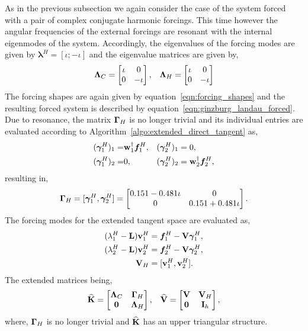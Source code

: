As in the previous subsection we again consider the case of the system forced with a pair of complex conjugate harmonic forcings. This time however the angular frequencies of the external forcings are resonant with the internal eigenmodes of the system. Accordingly, the eigenvalues of the forcing modes are given by $\boldsymbol{\lambda}^{H} = [\iota; -\iota]$ and the eigenvalue matrices are given by,
\begin{align}
	\mathbf{\Lambda}_{C} = 
	\begin{bmatrix}
		\iota & 0 \\ 
		0 &  -\iota 
	\end{bmatrix}, &&
	\mathbf{\Lambda}_{H} = 
	\begin{bmatrix}
		\iota & 0 \\ 
		0 &  -\iota 
	\end{bmatrix} \nonumber
\end{align}
The forcing shapes are again given by equation~\eqref{eqn:forcing_shapes} and the resulting forced system is described by equation~\eqref{eqn:ginzburg_landau_forced}. Due to resonance, the matrix $\mathbf{\Gamma}_{H}$ is no longer trivial and its individual entries are evaluated according to Algorithm~\ref{algo:extended_direct_tangent} as,
\begin{align}
	 (\boldsymbol{\gamma}^{H}_{1})_{1} =& \mathbf{w}_{1}^{\dagger}\boldsymbol{f}^{H}_{1}, &&
	 (\boldsymbol{\gamma}^{H}_{2})_{1} = 0, \nonumber \\
	 (\boldsymbol{\gamma}^{H}_{1})_{2} =& 0, &&
	 (\boldsymbol{\gamma}^{H}_{2})_{2} = \mathbf{w}_{2}^{\dagger}\boldsymbol{f}^{H}_{2}, \nonumber 
\end{align}
resulting in,
\begin{align}
	\mathbf{\Gamma}_{H} = [\boldsymbol{\gamma}^{H}_{1}, \boldsymbol{\gamma}^{H}_{2}] = 
	\begin{bmatrix}
		0.151-0.481\iota & 0 \\ 
		0 &  0.151+0.481\iota
	\end{bmatrix}. \nonumber 
\end{align}
The forcing modes for the extended tangent space are evaluated as,
\begin{align}
	(\lambda^{H}_{1} - \mathbf{L})\mathbf{v}^{H}_{1} &= \boldsymbol{f}^{H}_{1} - \mathbf{V}\boldsymbol{\gamma}^{H}_{1},  \nonumber \\
	(\lambda^{H}_{2} - \mathbf{L})\mathbf{v}^{H}_{2} &= \boldsymbol{f}^{H}_{2} - \mathbf{V}\boldsymbol{\gamma}^{H}_{2}, \nonumber \\
	\mathbf{V}_{H} &= [\mathbf{v}^{H}_{1}, \mathbf{v}^{H}_{2}]. \nonumber
\end{align}
The extended matrices being,
\begin{align}
	\mathbf{\widehat{K}} =
	\begin{bmatrix}
		\mathbf{\Lambda}_{C} & \mathbf{\Gamma}_{H} \\ 
		\mathbf{0} &  \mathbf{\Lambda}_{H}
	\end{bmatrix}, &&
	\mathbf{\widehat{V}} =
	\begin{bmatrix}
		\mathbf{V} & \mathbf{V}_{H} \\ 
		\mathbf{0} &  \mathbf{I}_{h}
	\end{bmatrix}, \nonumber 
\end{align}
where, $\mathbf{\Gamma}_{H}$ is no longer trivial and $\mathbf{\widehat{K}}$ has an upper triangular structure.

